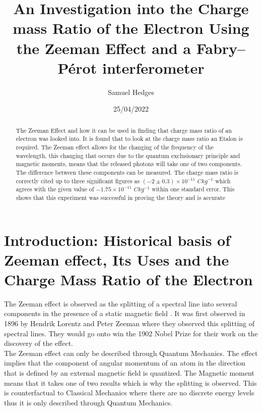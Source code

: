 \documentclass[a4paper,11pt]{article}
\begin{document}
\begin{figure}
\end{figure}




\title{An Investigation into the Charge mass Ratio of the Electron Using the Zeeman Effect and a Fabry–Pérot interferometer}
\author{Samuel Hedges}
\date{25/04/2022}
 \maketitle
 \newpage
\begin{abstract}
The Zeeman Effect and how it can be used in finding that charge mass ratio of an electron was looked into. It is found that to look at the charge mass ratio an Etalon is required. The Zeeman effect allows for the changing of the frequency of the wavelength, this changing that occurs due to the quantum exclusionary principle and magnetic moments, means that the released photons will take one of two components. The difference between these components can be measured. The charge mass ratio is correctly cited up to three significant figures as $(-2\pm0.3) \times10^{-11}$ $Ckg^{-1}$ which agrees with the given value of $-1.75 \times10^{-11}$ $Ckg^{-1}$ within one standard error. This shows that this experiment was successful in proving the theory and is accurate
\end{abstract}
 \newpage
 \tableofcontents
\newpage

\section{Introduction: Historical basis of Zeeman effect, Its Uses and the Charge Mass Ratio of the Electron}
The Zeeman effect is observed as the splitting of a spectral line into several components in the presence of a static magnetic field \cite{SCH1}. It was first observed in 1896 by Hendrik Lorentz and Peter Zeeman where they observed this splitting of spectral lines. They would go onto win the 1902 Nobel Prize for their work on the discovery of the effect.\\

The Zeeman effect can only be described through Quantum Mechanics. The effect implies that the component of angular momentum of an atom in the direction that is defined by an external magnetic field is quantized. The Magnetic moment means that it takes one of two results which is why the splitting is observed. This is counterfactual to Classical Mechanics where there are no discrete energy levels thus it is only described through Quantum Mechanics.\\
\end{document}
